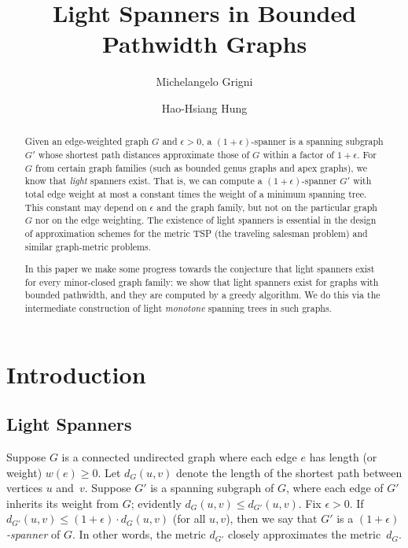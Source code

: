 \documentclass{llncs}
\title{Light Spanners in Bounded Pathwidth Graphs}
\author{Michelangelo Grigni \and  Hao-Hsiang Hung}
\institute{Dept.\ of Math \&\ CS, Emory University,
\textsl{\{mic,hhung2\}@mathcs.emory.edu}}
\begin{document}
\maketitle



\begin{abstract}

Given an edge-weighted graph $G$ and $\epsilon>0$, a
$(1+\epsilon)$-spanner is a spanning subgraph $G'$ whose shortest path
distances approximate those of $G$ within a factor of $1+\epsilon$.  
For $G$ from certain graph families (such as bounded genus graphs and apex
graphs), we know that \emph{light} spanners exist.  That is, we can
compute a $(1+\epsilon)$-spanner $G'$ with total edge weight at most a
constant times the weight of a minimum spanning tree.  This constant
may depend on $\epsilon$ and the graph family, but not on the
particular graph $G$ nor on the edge weighting.  The existence of
light spanners is essential in the design of approximation schemes for
the metric TSP (the traveling salesman problem) and similar
graph-metric problems.

In this paper we make some progress towards the conjecture that light
spanners exist for every minor-closed graph family: we show that light
spanners exist for graphs with bounded pathwidth, and they are computed
by a greedy algorithm.  We do this via the intermediate construction of
light \emph{monotone} spanning trees in such graphs.
\end{abstract}


\section{Introduction}


\subsection{Light Spanners}

Suppose $G$ is a connected undirected graph where each edge $e$ has
length (or weight) $w(e)\geq 0$.  Let $d_G (u, v)$ denote the length
of the shortest path between vertices $u$ and~$v$.  Suppose $G'$ is a
spanning subgraph of $G$, where each edge of $G'$ inherits its weight
from $G$; evidently $d_G(u,v) \leq d_{G'}(u,v)$.  Fix $\epsilon > 0$.
If $d_{G'}(u,v) \leq (1+\epsilon)\cdot d_G (u,v)$ (for all $u,v$),
then we say that $G'$ is a \emph{$(1+\epsilon)$-spanner} of $G$.  In
other words, the metric $d_{G'}$ closely approximates the
metric~$d_G$.
\end{document}
